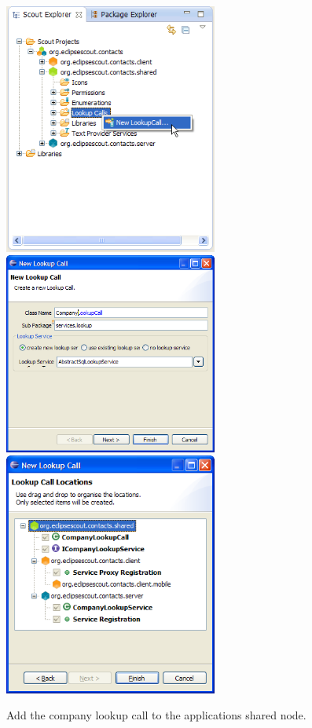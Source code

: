 \documentclass[a4paper,10pt,twoside]{book}
\begin{document}
\begin{figure}
\includegraphics[width=7cm]{new_lookupcall_company_contextmenu.png} \hspace{2mm}
\includegraphics[width=7cm]{new_lookupcall_company_1.png} \hspace{2mm}
\includegraphics[width=7cm]{new_lookupcall_company_2.png}
\caption{Add the company lookup call to the applications shared node.}
\end{figure}
\end{document}
